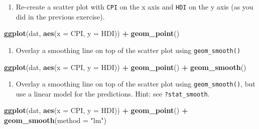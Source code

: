\documentclass[]{book}
\newenvironment{Shaded}{\begin{snugshade}}{\end{snugshade}}
\newcommand{\KeywordTok}[1]{\textcolor[rgb]{0.13,0.29,0.53}{\textbf{#1}}}
\newcommand{\DataTypeTok}[1]{\textcolor[rgb]{0.13,0.29,0.53}{#1}}
\newcommand{\StringTok}[1]{\textcolor[rgb]{0.31,0.60,0.02}{#1}}
\newcommand{\OperatorTok}[1]{\textcolor[rgb]{0.81,0.36,0.00}{\textbf{#1}}}
\newcommand{\NormalTok}[1]{#1}
\providecommand{\tightlist}{%
  \setlength{\itemsep}{0pt}\setlength{\parskip}{0pt}}
\begin{document}
\begin{enumerate}
\def\labelenumi{\arabic{enumi}.}
\tightlist
\item
  Re-create a scatter plot with \texttt{CPI} on the x axis and
  \texttt{HDI} on the y axis (as you did in the previous exercise).
\end{enumerate}

\begin{Shaded}
\begin{Highlighting}[]
\KeywordTok{ggplot}\NormalTok{(dat, }\KeywordTok{aes}\NormalTok{(}\DataTypeTok{x =}\NormalTok{ CPI, }\DataTypeTok{y =}\NormalTok{ HDI)) }\OperatorTok{+}
\StringTok{  }\KeywordTok{geom_point}\NormalTok{()}
\end{Highlighting}
\end{Shaded}

\begin{enumerate}
\def\labelenumi{\arabic{enumi}.}
\setcounter{enumi}{1}
\tightlist
\item
  Overlay a smoothing line on top of the scatter plot using
  \texttt{geom\_smooth()}
\end{enumerate}

\begin{Shaded}
\begin{Highlighting}[]
\KeywordTok{ggplot}\NormalTok{(dat, }\KeywordTok{aes}\NormalTok{(}\DataTypeTok{x =}\NormalTok{ CPI, }\DataTypeTok{y =}\NormalTok{ HDI)) }\OperatorTok{+}
\StringTok{  }\KeywordTok{geom_point}\NormalTok{() }\OperatorTok{+}
\StringTok{  }\KeywordTok{geom_smooth}\NormalTok{()}
\end{Highlighting}
\end{Shaded}

\begin{enumerate}
\def\labelenumi{\arabic{enumi}.}
\setcounter{enumi}{2}
\tightlist
\item
  Overlay a smoothing line on top of the scatter plot using
  \texttt{geom\_smooth()}, but use a linear model for the predictions.
  Hint: see \texttt{?stat\_smooth}.
\end{enumerate}

\begin{Shaded}
\begin{Highlighting}[]
\KeywordTok{ggplot}\NormalTok{(dat, }\KeywordTok{aes}\NormalTok{(}\DataTypeTok{x =}\NormalTok{ CPI, }\DataTypeTok{y =}\NormalTok{ HDI)) }\OperatorTok{+}
\StringTok{  }\KeywordTok{geom_point}\NormalTok{() }\OperatorTok{+}
\StringTok{  }\KeywordTok{geom_smooth}\NormalTok{(}\DataTypeTok{method =} \StringTok{"lm"}\NormalTok{)}
\end{Highlighting}
\end{Shaded}
\end{document}
